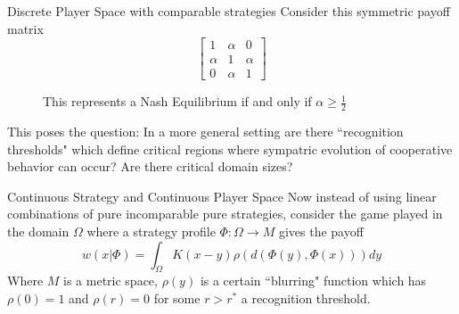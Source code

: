 \documentclass{beamer}
\begin{document}
\begin{frame}{Discrete Player Space with comparable strategies}
	Consider this symmetric payoff matrix
	\begin{equation}
		\begin{bmatrix}
			1&\alpha&0\\
			\alpha&1&\alpha\\
			0&\alpha&1
		\end{bmatrix}
	\end{equation}
	\begin{figure} 
	\caption{This represents a Nash Equilibrium if and only if $\alpha\geq \frac{1}{2}$}
\end{figure}	
	This poses the question: In a more general setting are there ``recognition thresholds" which define critical regions where sympatric evolution of cooperative behavior can occur? Are there critical domain sizes?   
\end{frame}
	
\begin{frame}{Continuous Strategy and Continuous Player Space}
	Now instead of using linear combinations of pure incomparable pure strategies, consider the game played in the domain $\Omega$ where a strategy profile $\Phi:\Omega \rightarrow M$ gives the payoff
	\begin{equation}
		w(x|\Phi)= \int_\Omega K(x-y)\rho(d(\Phi(y),\Phi(x)))dy
	\end{equation}
	Where $M$ is a metric space, $\rho(y)$ is a certain ``blurring" function which has $\rho (0)=1$ and $\rho(r)=0$ for some $r>r^*$ a recognition threshold. 
\end{frame}
\end{document}

